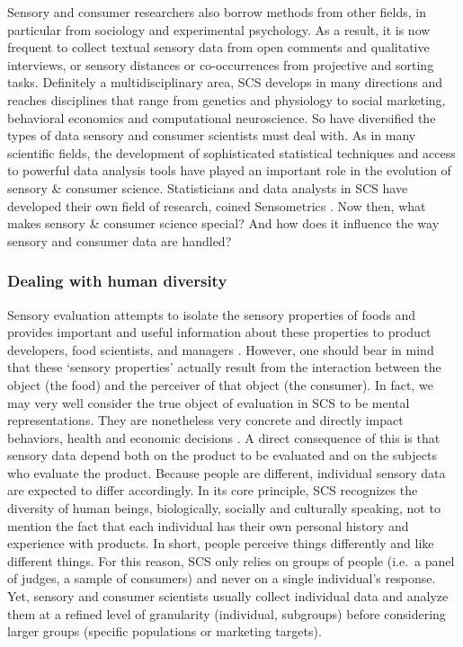 \documentclass[
]{krantz}
\begin{document}
Sensory and consumer researchers also borrow methods from other fields, in particular from sociology and experimental psychology. As a result, it is now frequent to collect textual sensory data from open comments and qualitative interviews, or sensory distances or co-occurrences from projective and sorting tasks. Definitely a multidisciplinary area, SCS develops in many directions and reaches disciplines that range from genetics and physiology to social marketing, behavioral economics and computational neuroscience. So have diversified the types of data sensory and consumer scientists must deal with. As in many scientific fields, the development of sophisticated statistical techniques and access to powerful data analysis tools have played an important role in the evolution of sensory \& consumer science. Statisticians and data analysts in SCS have developed their own field of research, coined Sensometrics \citep{Schlich1993, Brockhoff2011, Qannari2017}. Now then, what makes sensory \& consumer science special? And how does it influence the way sensory and consumer data are handled?

\hypertarget{dealing-with-human-diversity}{%
\subsubsection{Dealing with human diversity}\label{dealing-with-human-diversity}}

Sensory evaluation attempts to isolate the sensory properties of foods and provides important and useful information about these properties to product developers, food scientists, and managers \citep{LawlessHeym2010}. However, one should bear in mind that these `sensory properties' actually result from the interaction between the object (the food) and the perceiver of that object (the consumer). In fact, we may very well consider the true object of evaluation in SCS to be mental representations. They are nonetheless very concrete and directly impact behaviors, health and economic decisions \citep{Kahneman2000}.
A direct consequence of this is that sensory data depend both on the product to be evaluated and on the subjects who evaluate the product. Because people are different, individual sensory data are expected to differ accordingly. In its core principle, SCS recognizes the diversity of human beings, biologically, socially and culturally speaking, not to mention the fact that each individual has their own personal history and experience with products. In short, people perceive things differently and like different things. For this reason, SCS only relies on groups of people (i.e.~a panel of judges, a sample of consumers) and never on a single individual's response. Yet, sensory and consumer scientists usually collect individual data and analyze them at a refined level of granularity (individual, subgroups) before considering larger groups (specific populations or marketing targets).
\end{document}

